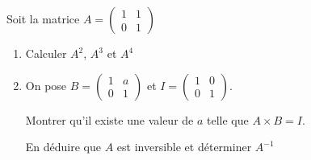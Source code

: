 
%
Soit la matrice $A=\begin{pmatrix} 1 & 1\\ 0 & 1 \end{pmatrix}$
\begin{enumerate}
     \item
     Calculer $A^{2}$, $A^{3}$ et $A^{4}$
     \item
     On pose $B=\begin{pmatrix} 1 & a \\ 0 & 1 \end{pmatrix}$ et $I=\begin{pmatrix} 1 & 0 \\ 0 & 1 \end{pmatrix}$.
     \par
     Montrer qu'il existe une valeur de $a$ telle que $A\times B=I$.
     \par
     En déduire que $A$ est inversible et déterminer $A^{-1}$
\end{enumerate}
